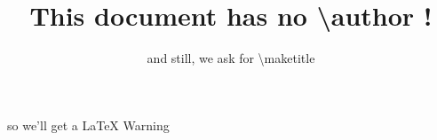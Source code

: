 \documentclass{article}
\title{This document has no \textbackslash author !}
\date{and still, we ask for \textbackslash maketitle}
\begin{document}
\maketitle

\begin{center}
  so we'll get a LaTeX Warning
\end{center}
\end{document}
